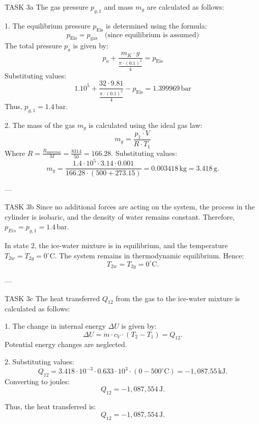 TASK 3a  
The gas pressure \( p_{g,1} \) and mass \( m_g \) are calculated as follows:  

1. The equilibrium pressure \( p_{\text{Eis}} \) is determined using the formula:  
\[
p_{\text{Eis}} = p_{\text{gas}} \quad \text{(since equilibrium is assumed)}  
\]  
The total pressure \( p_a \) is given by:  
\[
p_a + \frac{m_K \cdot g}{\frac{\pi \cdot (0.1)^2}{4}} = p_{\text{Eis}}
\]  
Substituting values:  
\[
1.10^5 + \frac{32 \cdot 9.81}{\frac{\pi \cdot (0.1)^2}{4}} - p_{\text{Eis}} = 1.399969 \, \text{bar}
\]  
Thus, \( p_{g,1} = 1.4 \, \text{bar} \).  

2. The mass of the gas \( m_g \) is calculated using the ideal gas law:  
\[
m_g = \frac{p_1 \cdot V}{R \cdot T_1}
\]  
Where \( R = \frac{R_{\text{universal}}}{M} = \frac{8314}{50} = 166.28 \).  
Substituting values:  
\[
m_g = \frac{1.4 \cdot 10^5 \cdot 3.14 \cdot 0.001}{166.28 \cdot (500 + 273.15)} = 0.003418 \, \text{kg} = 3.418 \, \text{g}.
\]  

---

TASK 3b  
Since no additional forces are acting on the system, the process in the cylinder is isobaric, and the density of water remains constant. Therefore, \( p_{Eis} = p_{g,1} = 1.4 \, \text{bar} \).  

In state 2, the ice-water mixture is in equilibrium, and the temperature \( T_{2w} = T_{2g} = 0^\circ\text{C} \). The system remains in thermodynamic equilibrium. Hence:  
\[
T_{2w} = T_{2g} = 0^\circ\text{C}.
\]  

---

TASK 3c  
The heat transferred \( Q_{12} \) from the gas to the ice-water mixture is calculated as follows:  

1. The change in internal energy \( \Delta U \) is given by:  
\[
\Delta U = \dot{m} \cdot c_V \cdot (T_2 - T_1) = Q_{12}.
\]  
Potential energy changes are neglected.  

2. Substituting values:  
\[
Q_{12} = 3.418 \cdot 10^{-3} \cdot 0.633 \cdot 10^3 \cdot (0 - 500^\circ\text{C}) = -1,087.55 \, \text{kJ}.
\]  
Converting to joules:  
\[
Q_{12} = -1,087,554 \, \text{J}.
\]  

Thus, the heat transferred is:  
\[
Q_{12} = -1,087,554 \, \text{J}.
\]